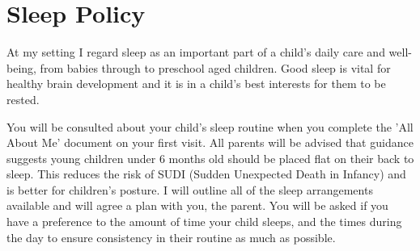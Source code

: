 

\section{Sleep Policy}

At my setting I regard sleep as an important part of a child's daily care and well-being, from babies through to preschool aged children. Good sleep is vital for healthy brain development and it is in a child's best interests for them to be rested.

You will be consulted about your child's sleep routine when you complete the 'All About Me' document on your first visit. All parents will be advised that guidance suggests young children under 6 months old should be placed flat on their back to sleep. This reduces the risk of SUDI (Sudden Unexpected Death in Infancy) and is better for children's posture. I will outline all of the sleep arrangements available and will agree a plan with you, the parent. You will be asked if you have a preference to the amount of time your child sleeps, and the times during the day to ensure consistency in their routine as much as possible.

